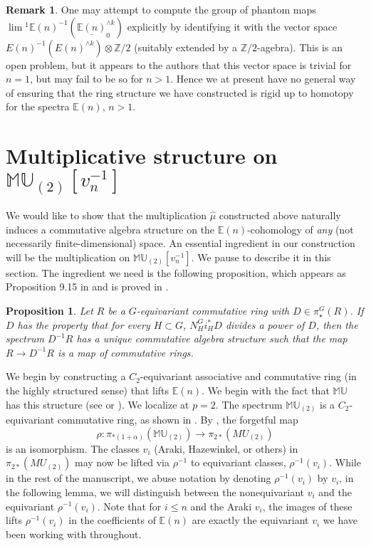 \documentclass[12pt]{amsart}
\numberwithin{equation}{section}
\theoremstyle{plain}  %
\newtheorem{prop}[equation]{Proposition}
\theoremstyle{definition}  %
\newtheorem{remark}[equation]{Remark}
\newcommand{\ZZ}{\mathbb{Z}}
\newcommand{\MU}{\mathbb {MU}}
\newcommand{\E}{\mathbb{E}}
\begin{document}
\medskip
\begin{remark}
One may attempt to compute the group of phantom maps $\lim{}^1 \E(n)^{-1} (\underline{\E(n)}_0^{\wedge k})$ explicitly by identifying it with the vector space $E(n)^{-1}(E(n)^{\wedge k}) \otimes \ZZ/2 $ (suitably extended by a $\ZZ/2$-agebra). This is an open problem, but it appears to the authors that this vector space is trivial for $n=1$, but may fail to be so for $n>1$. Hence we at present have no general way of ensuring that the ring structure we have constructed is rigid up to homotopy for the spectra $\E(n)$, $n>1$.
\end{remark}

\section{Multiplicative structure on $\MU_{(2)}[v_n^{-1}]$} \label{commutative MU}

\medskip
\noindent
We would like to show that the multiplication $\hat{\mu}$ constructed above naturally induces a commutative algebra structure on the $\E(n)$-cohomology of \emph{any} (not necessarily finite-dimensional) space. An essential ingredient in our construction will be the multiplication on $\MU_{(2)}[v_n^{-1}]$. We pause to describe it in this section. The ingredient we need is the following proposition, which appears as Proposition 9.15 in \cite{HHR16} and is proved in \cite{HH13}.

\medskip
\begin{prop}\label{prop:hhr}\cite[Corollary 4.11]{HH13} Let $R$ be a $G$-equivariant commutative ring with $D \in \pi_\star^G(R)$. If $D$ has the property that for every $H \subset G$, $N_H^Gi_H^*D$ divides a power of $D$, then the spectrum $D^{-1}R$ has a unique commutative algebra structure such that the map $R \longrightarrow D^{-1}R$ is a map of commutative rings.
\end{prop}


We begin by constructing a $C_2$-equivariant associative and commutative ring (in the highly structured sense) that lifts $\E(n)$. We begin with the fact that $\MU$ has this structure (see \cite{HHR16} or \cite{HK01}). We localize at $p=2$. The spectrum $\MU_{(2)}$ is a $C_2$-equivariant commutative ring, as shown in \cite{HH13}. By \cite{HK01}, the forgetful map
$$\rho: \pi_{\ast(1+\alpha)}(\MU_{(2)}) \longrightarrow \pi_{2\ast}(MU_{(2)})$$
is an isomorphism. The classes $v_i$ (Araki, Hazewinkel, or others) in $\pi_{2\ast}(MU_{(2)})$ may now be lifted via $\rho^{-1}$ to equivariant classes, $\rho^{-1}(v_i)$. While in the rest of the manuscript, we abuse notation by denoting $\rho^{-1}(v_i)$ by $v_i$, in the following lemma, we will distinguish between the nonequivariant $v_i$ and the equivariant $\rho^{-1}(v_i)$. Note that for $i\leq n$ and the Araki $v_i$, the images of these lifts $\rho^{-1}(v_i)$ in the coefficients of $\E(n)$ are exactly the equivariant $v_i$ we have been working with throughout.
\end{document}

